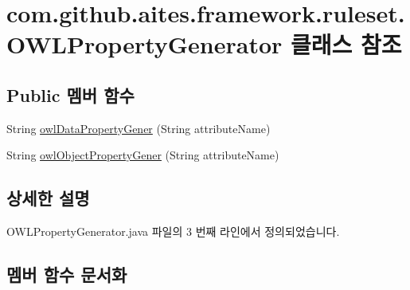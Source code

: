 \hypertarget{classcom_1_1github_1_1aites_1_1framework_1_1ruleset_1_1_o_w_l_property_generator}{}\section{com.\+github.\+aites.\+framework.\+ruleset.\+O\+W\+L\+Property\+Generator 클래스 참조}
\label{classcom_1_1github_1_1aites_1_1framework_1_1ruleset_1_1_o_w_l_property_generator}
\subsection*{Public 멤버 함수}
\begin{DoxyCompactItemize}
\item 
String \mbox{\hyperlink{classcom_1_1github_1_1aites_1_1framework_1_1ruleset_1_1_o_w_l_property_generator_a2b40d39a9f8765037b753f32c460f1cd}{owl\+Data\+Property\+Gener}} (String attribute\+Name)
\item 
String \mbox{\hyperlink{classcom_1_1github_1_1aites_1_1framework_1_1ruleset_1_1_o_w_l_property_generator_a64f6c8ae732b491ab3cc26f3f432931a}{owl\+Object\+Property\+Gener}} (String attribute\+Name)
\end{DoxyCompactItemize}


\subsection{상세한 설명}


O\+W\+L\+Property\+Generator.\+java 파일의 3 번째 라인에서 정의되었습니다.



\subsection{멤버 함수 문서화}
\mbox{\label{classcom_1_1github_1_1aites_1_1framework_1_1ruleset_1_1_o_w_l_property_generator_a2b40d39a9f8765037b753f32c460f1cd}} 
